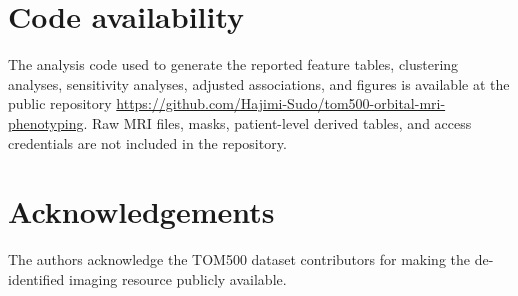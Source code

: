 \documentclass[utf8]{FrontiersinVancouver}
\begin{document}
\section*{Code availability}
The analysis code used to generate the reported feature tables, clustering analyses, sensitivity analyses, adjusted associations, and figures is available at the public repository \href{https://github.com/Hajimi-Sudo/tom500-orbital-mri-phenotyping}{https://github.com/Hajimi-Sudo/tom500-orbital-mri-phenotyping}. Raw MRI files, masks, patient-level derived tables, and access credentials are not included in the repository.

\section*{Acknowledgements}
The authors acknowledge the TOM500 dataset contributors for making the de-identified imaging resource publicly available.



\end{document}
